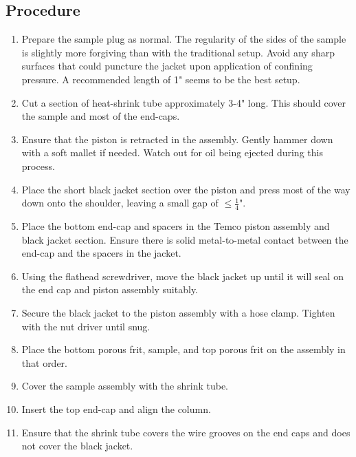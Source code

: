 \subsection{Procedure}

\begin{enumerate}

\item{Prepare the sample plug as normal.  The regularity of the sides of the sample is slightly more forgiving than with the traditional setup.  Avoid any sharp surfaces that could puncture the jacket upon application of confining pressure.  A recommended length of 1" seems to be the best setup.}

\item{Cut a section of heat-shrink tube approximately 3-4" long.  This should cover the sample and most of the end-caps.}

\item{Ensure that the piston is retracted in the assembly.  Gently hammer down with a soft mallet if needed.  Watch out for oil being ejected during this process.}

\item{Place the short black jacket section over the piston and press most of the way down onto the shoulder, leaving a small gap of $\leq \frac{1}{4}$".}

\item{Place the bottom end-cap  and spacers in the Temco piston assembly and black jacket section.  Ensure there is solid metal-to-metal contact between the end-cap and the spacers in the jacket.}

\item{Using the flathead screwdriver, move the black jacket up until it will seal on the end cap and piston assembly suitably.}

\item{Secure the black jacket to the piston assembly with a hose clamp.  Tighten with the nut driver until snug.}

\item{Place the bottom porous frit, sample, and top porous frit on the assembly in that order.}

\item{Cover the sample assembly with the shrink tube.}

\item{Insert the top end-cap and align the column.}

\item {Ensure that the shrink tube covers the wire grooves on the end caps and does not cover the black jacket.}


\end{enumerate}
